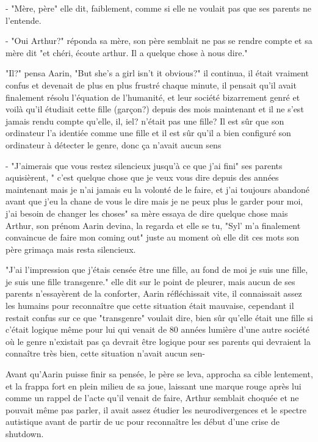 \documentclass[12pt,hidelinks,a4paper]{book}
\begin{document}
- "Mère, père" elle dit, faiblement, comme si elle ne voulait pas que ses parents ne l'entende.\par
- "Oui Arthur?" réponda sa mère, son père semblait ne pas se rendre compte et sa mère dit "et chéri, écoute arthur. Il 
a quelque chose à nous dire."\par \bigskip

"Il?" pensa Aarin, "But she's a girl isn't it obvious?" il continua, il était vraiment confus et devenait de plus 
en plus frustré chaque minute, il pensait qu'il avait finalement résolu l'équation de l'humanité, et leur 
société bizarrement genré et voilà qu'il étudiait cette fille (garçon?) depuis des mois maintenant et il ne s'est 
jamais rendu compte qu'elle, il, iel? n'était pas une fille? Il est sûr que son ordinateur l'a identiée comme une fille 
et il est sûr qu'il a bien configuré son ordinateur à détecter le genre, donc ça n'avait aucun sens\par 
\bigskip
- "J'aimerais que vous restez silencieux jusqu'à ce que j'ai fini" ses parents aquisièrent, 
" c'est quelque chose que je veux vous dire depuis des années maintenant mais je n'ai jamais eu la volonté de le faire,
et j'ai toujours abandoné avant que j'eu la chane de vous le dire mais je ne peux plus le garder pour moi, j'ai 
besoin de changer les choses" sa mère essaya de dire quelque chose mais Arthur, son prénom Aarin devina, la regarda et elle 
se tu, "Syl' m'a finalement convaincue de faire mon coming out" juste au moment où elle dit ces mots son père grimaça 
mais resta silencieux.\par \bigskip 

"J'ai l'impression que j'étais censée être une fille, au fond de moi je suis une fille, je suis une fille transgenre." elle dit sur le 
point de pleurer, mais aucun de ses parents n'essayèrent de la conforter, Aarin réfléchissait vite, il connaissait assez 
les humains pour reconnaître que cette situation était mauvaise, cependant il restait confus sur ce que "transgenre" voulait 
dire, bien sûr qu'elle était une fille si c'était logique même pour lui qui venait de 80 années lumière d'une autre société 
où le genre n'existait pas ça devrait être logique pour ses parents qui devraient la connaître très bien, cette situation 
n'avait aucun sen-\par 
\bigskip

Avant qu'Aarin puisse finir sa pensée, le père se leva, approcha sa cible lentement, et la frappa fort en plein milieu de 
sa joue, laissant une marque rouge après lui comme un rappel de l'acte qu'il venait de faire, Arthur semblait choquée et 
ne pouvait même pas parler, il avait assez étudier les neurodivergences et le spectre autistique avant de partir de \gls{uc} 
pour reconnaître les début d'une crise de shutdown.\par 
\bigskip 
\end{document}
